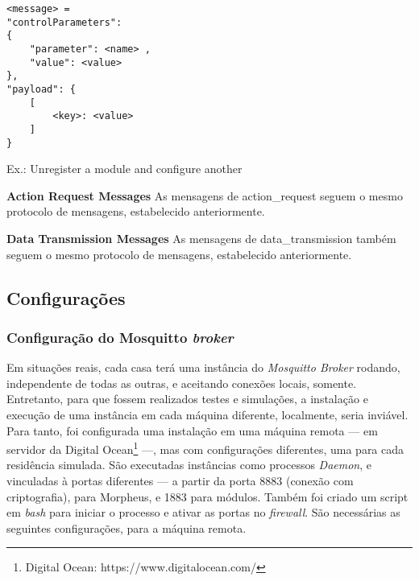 \begin{lstlisting}
<message> =
"controlParameters":
{
    "parameter": <name> ,
    "value": <value>
},
"payload": {
    [
        <key>: <value>
    ]
}
\end{lstlisting}

Ex.: Unregister a module and configure another


\textbf{Action Request Messages}
As mensagens de action\_request seguem o mesmo protocolo de mensagens, estabelecido anteriormente.

\textbf{Data Transmission Messages}
As mensagens de data\_transmission também seguem o mesmo protocolo de mensagens, estabelecido anteriormente.

\subsection{Configurações}

\subsubsection{Configuração do \wmqtt{} Mosquitto \emph{broker}}

Em situações reais, cada casa terá uma instância do \emph{Mosquitto Broker} rodando, independente de todas as outras, e aceitando conexões locais, somente. Entretanto, para que fossem realizados testes e simulações, a instalação e execução de uma instância em cada máquina diferente, localmente, seria inviável. Para tanto, foi configurada uma instalação em uma máquina remota --- em servidor da Digital Ocean\footnote{Digital Ocean: https://www.digitalocean.com/} ---, mas com configurações diferentes, uma para cada residência simulada. São executadas instâncias como processos \emph{Daemon}, e vinculadas à portas diferentes --- a partir da porta 8883 (conexão com criptografia), para Morpheus, e 1883 para módulos. Também foi criado um script em \emph{bash} para iniciar o processo e ativar as portas no \emph{firewall}. São necessárias as seguintes configurações, para a máquina remota.


